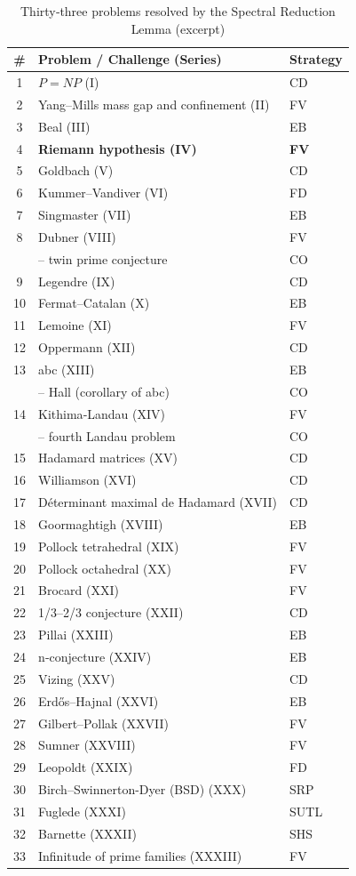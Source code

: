 \documentclass[11pt,a4paper]{article}
\begin{document}
\begin{center}
\small
\begin{longtable}{@{}cll@{}}
\caption{Thirty‑three problems resolved by the Spectral Reduction Lemma (excerpt)}\\
\toprule
\# & Problem / Challenge (Series) & Strategy \\
\midrule
1 & \(P = NP\) (I) & CD \\
2 & Yang–Mills mass gap and confinement (II) & FV \\
3 & Beal (III) & EB \\
4 & \textbf{Riemann hypothesis (IV)} & \textbf{FV} \\
5 & Goldbach (V) & CD \\
6 & Kummer–Vandiver (VI) & FD \\
7 & Singmaster (VII) & EB \\
8 & Dubner (VIII) & FV \\
   & \quad – twin prime conjecture & CO \\
9 & Legendre (IX) & CD \\
10 & Fermat–Catalan (X) & EB \\
11 & Lemoine (XI) & FV \\
12 & Oppermann (XII) & CD \\
13 & abc (XIII) & EB \\
   & \quad – Hall (corollary of abc) & CO \\
14 & Kithima‑Landau (XIV) & FV \\
    & \quad – fourth Landau problem & CO \\
15 & Hadamard matrices (XV) & CD \\
16 & Williamson (XVI) & CD \\
17 & Déterminant maximal de Hadamard (XVII) & CD \\
18 & Goormaghtigh (XVIII) & EB \\
19 & Pollock tetrahedral (XIX) & FV \\
20 & Pollock octahedral (XX) & FV \\
21 & Brocard (XXI) & FV \\
22 & 1/3–2/3 conjecture (XXII) & CD \\
23 & Pillai (XXIII) & EB \\
24 & n‑conjecture (XXIV) & EB \\
25 & Vizing (XXV) & CD \\
26 & Erdős–Hajnal (XXVI) & EB \\
27 & Gilbert–Pollak (XXVII) & FV \\
28 & Sumner (XXVIII) & FV \\
29 & Leopoldt (XXIX) & FD \\
30 & Birch–Swinnerton-Dyer (BSD) (XXX) & SRP \\
31 & Fuglede (XXXI) & SUTL \\
32 & Barnette (XXXII) & SHS \\
33 & Infinitude of prime families (XXXIII) & FV \\
\bottomrule
\end{longtable}
\end{center}
\end{document}
